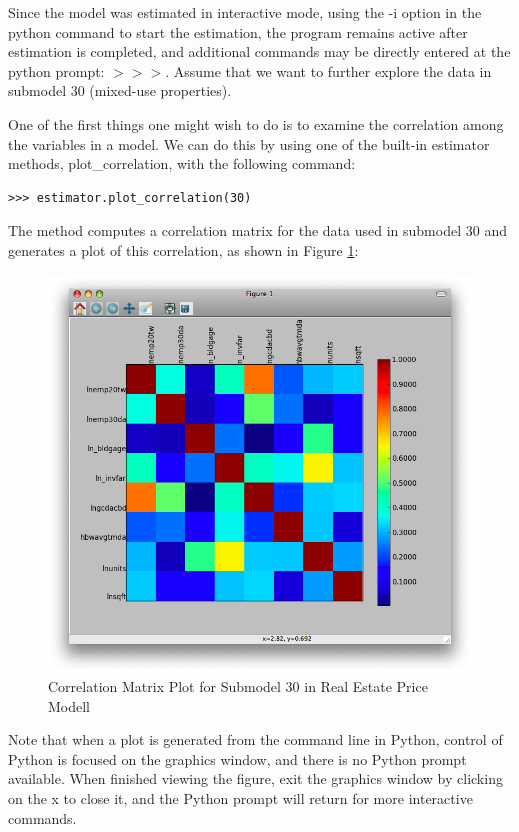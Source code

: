 Since the model was estimated in interactive mode, using the
-i option in the python command to start the estimation, the
program remains active after estimation is completed, and
additional commands may be directly entered at the python
prompt: $>>>$.  Assume that we want to further explore the
data in submodel 30 (mixed-use properties).

One of the first things one might wish to do is to examine
the correlation among the variables in a model.  We can do
this by using one of the built-in estimator methods,
plot\_correlation, with the following command:

\begin{verbatim}
>>> estimator.plot_correlation(30)
\end{verbatim}

The method computes a correlation matrix for the data used
in submodel 30 and generates a plot of this correlation, as
shown in Figure \ref{fig:correlation30}:

\begin{figure}[htp]
\begin{center}
\includegraphics[scale=0.35]{graphics/correlation30.png}
\end{center}
\caption{Correlation Matrix Plot for Submodel 30 in Real Estate Price Modell}
\label{fig:correlation30}
\end{figure}

Note that when a plot is generated from the command line in
Python, control of Python is focused on the graphics window,
and there is no Python prompt available.  When finished
viewing the figure, exit the graphics window by clicking on
the x to close it, and the Python prompt will return for
more interactive commands.

